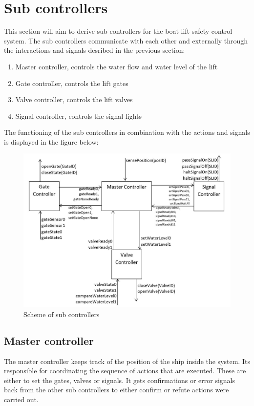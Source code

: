 \section{Sub controllers}
This section will aim to derive sub controllers for the boat lift safety control system. The sub controllers communicate with each other and externally through the interactions and signals desribed in the previous section:

\begin{enumerate}
	\item Master controller, controls the water flow and water level of the lift
	\item Gate controller, controls the lift gates
	\item Valve controller, controls the lift valves
	\item Signal controller, controls the signal lights
\end{enumerate}

\noindent The functioning of the sub controllers in combination with the actions and signals is displayed in the figure below:

\begin{figure}[!h]
	\includegraphics[width=\linewidth]{controllers}
	\caption{Scheme of sub controllers}
	\label{fig:subcontrollers}
\end{figure}
\subsection{Master controller}
The master controller keeps track of the position of the ship inside the system. Its responsible for coordinating the sequence of actions that are executed. These are either to set the gates, valves or signals. It gets confirmations or error signals back from the other sub controllers to either confirm or refute actions were carried out. \\

